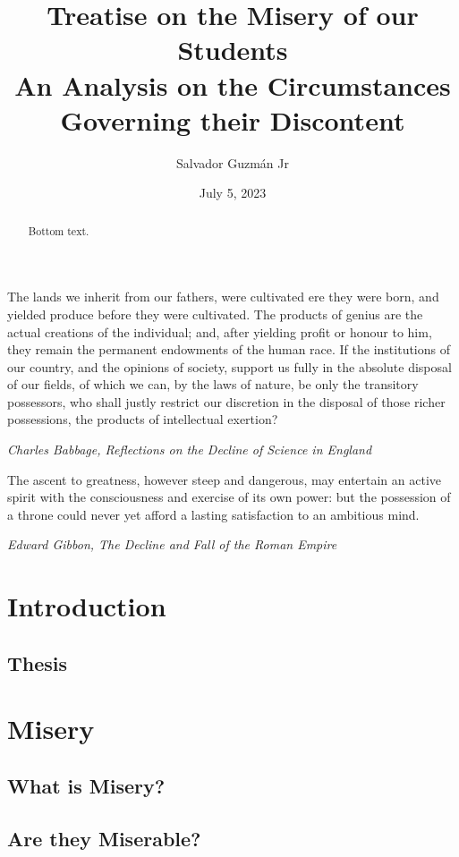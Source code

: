 \documentclass[12pt]{article}
\title{%
	Treatise on the Misery of our Students\\
	\large An Analysis on the Circumstances Governing their Discontent
}
\author{Salvador Guzm\'an Jr}
\date{July 5, 2023}
\begin{document}
	\maketitle
	\newpage

	\begin{abstract}
		Bottom text.
	\end{abstract}

	\newpage

	\begin{center}
		\epigraph{
			The lands we inherit from our fathers, were cultivated ere they were born, and yielded produce before they were cultivated. The products of genius are the actual creations of the individual; and, after yielding profit or honour to him, they remain the permanent endowments of the human race. If the institutions of our country, and the opinions of society, support us fully in the absolute disposal of our fields, of which we can, by the laws of nature, be only the transitory possessors, who shall justly restrict our discretion in the disposal of those richer possessions, the products of intellectual exertion?
		}{\textit{Charles Babbage, Reflections on the Decline of Science in England}}
		\epigraph{
			The ascent to greatness, however steep and dangerous, may entertain an active spirit with the consciousness and exercise of its own power: but the possession of a throne could never yet afford a lasting satisfaction to an ambitious mind.
		}{\textit{Edward Gibbon, The Decline and Fall of the Roman Empire}}
	\end{center}

	\newpage
	\tableofcontents
	\newpage
	
	\section{Introduction}
	\subsection{Thesis}
	\section{Misery}
	\subsection{What is Misery?}
	\subsection{Are they Miserable?}
\end{document}
